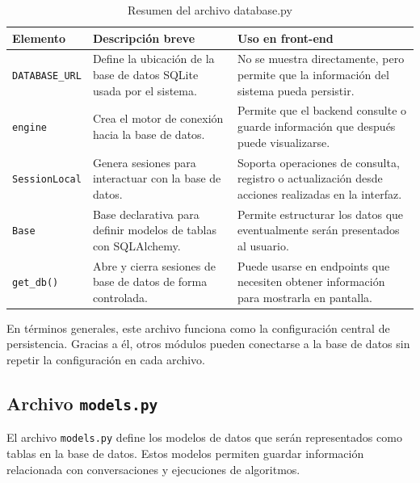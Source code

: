 \documentclass[12pt]{article}
\begin{document}
	\begin{table}[H]
		\centering
		\begin{tabular}{|p{4cm}|p{5cm}|p{5cm}|}
			\hline
			\textbf{Elemento} & \textbf{Descripción breve} & \textbf{Uso en front-end} \\
			\hline
			\texttt{DATABASE\_URL} & Define la ubicación de la base de datos SQLite usada por el sistema. & No se muestra directamente, pero permite que la información del sistema pueda persistir. \\
			\hline
			\texttt{engine} & Crea el motor de conexión hacia la base de datos. & Permite que el backend consulte o guarde información que después puede visualizarse. \\
			\hline
			\texttt{SessionLocal} & Genera sesiones para interactuar con la base de datos. & Soporta operaciones de consulta, registro o actualización desde acciones realizadas en la interfaz. \\
			\hline
			\texttt{Base} & Base declarativa para definir modelos de tablas con SQLAlchemy. & Permite estructurar los datos que eventualmente serán presentados al usuario. \\
			\hline
			\texttt{get\_db()} & Abre y cierra sesiones de base de datos de forma controlada. & Puede usarse en endpoints que necesiten obtener información para mostrarla en pantalla. \\
			\hline
		\end{tabular}
		\caption{Resumen del archivo database.py}
	\end{table}
	
	En términos generales, este archivo funciona como la configuración central de persistencia. Gracias a él, otros módulos pueden conectarse a la base de datos sin repetir la configuración en cada archivo.
	
	\subsection{Archivo \texttt{models.py}}
	
	El archivo \texttt{models.py} define los modelos de datos que serán representados como tablas en la base de datos. Estos modelos permiten guardar información relacionada con conversaciones y ejecuciones de algoritmos.
	
\end{document}
